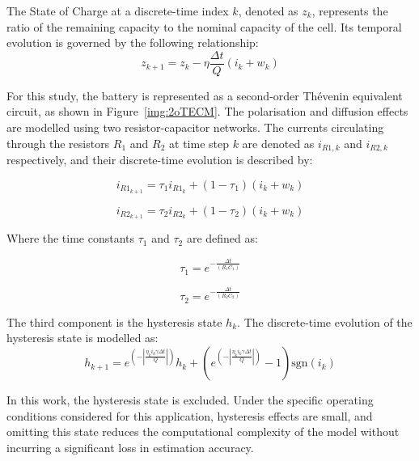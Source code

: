 The State of Charge at a discrete-time index $k$, denoted as $z_k$, represents the ratio of the remaining 
capacity to the nominal capacity of the cell. Its temporal evolution is governed by the following relationship:
\begin{equation}
    z_{k+1} = z_k - \eta \frac{\Delta t}{Q}(i_k + w_k)
    \label{eq:zESC}
\end{equation}

For this study, the battery is represented as a second-order Thévenin equivalent circuit, as shown in 
Figure~\ref{img:2oTECM}. The polarisation and diffusion effects are modelled using 
two resistor-capacitor networks. The currents circulating through the resistors $R_1$ and $R_2$ at 
time step $k$ are denoted as $i_{R1,k}$ and $i_{R2,k}$ respectively, and their discrete-time evolution is described by:


\begin{equation}
    i_{R1_{k+1}} = \tau_1 i_{R1_{k}} + (1 - \tau_1)(i_k + w_k)
    \label{eq:iR1}
\end{equation}

\begin{equation}
    i_{R2_{k+1}} = \tau_2 i_{R2_{k}} + (1 - \tau_2)(i_k + w_k)
    \label{eq:iR2}
\end{equation}

Where the time constants $\tau_1$ and $\tau_2$ are defined as:

\begin{equation}
    \tau_1 = e^{-\frac{\Delta t}{(R_1 C_1)}}
    \label{eq:tau1}
\end{equation}

\begin{equation}
    \tau_2 = e^{-\frac{\Delta t}{(R_2 C_2)}}
    \label{eq:tau2}
\end{equation}

The third component is the hysteresis state $h_k$. The discrete-time evolution of the hysteresis state is modelled as:
\begin{equation}
    h_{k+1} = e^{\left(-\left| \frac{\eta_k i_k \gamma \Delta t}{Q} \right|\right)} h_k + 
    (e^{\left(-\left| \frac{\eta_k i_k \gamma \Delta t}{Q} \right|\right)} -1) \text{sgn}(i_k)
    \end{equation}

In this work, the hysteresis state is excluded. Under the specific operating conditions considered for this application, 
hysteresis effects are small, and omitting this state reduces the computational complexity of the model without incurring a 
significant loss in estimation accuracy.

